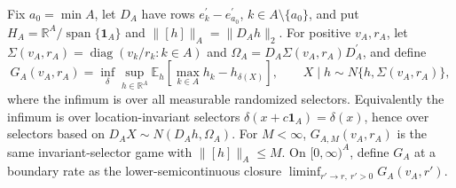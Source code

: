 Fix \(a_0=\min A\), let \(D_A\) have rows \(e_k^{\prime}-e_{a_0}^{\prime}\), \(k\in A\setminus\{a_0\}\), and put \(H_A=\mathbb R^A/\operatorname{span}\{\mathbf 1_A\}\) and \(\lVert[h]\rVert_A=\lVert D_Ah\rVert_2\).  For positive \(v_A,r_A\), let \(\Sigma(v_A,r_A)=\operatorname{diag}(v_k/r_k:k\in A)\) and \(\Omega_A=D_A\Sigma(v_A,r_A)D_A^{\prime}\), and define
\[
G_A(v_A,r_A)=\inf_{\delta}\sup_{h\in\mathbb R^A}\mathbb E_h\!\left[\max_{k\in A}h_k-h_{\delta(X)}\right],\qquad X\mid h\sim N\{h,\Sigma(v_A,r_A)\},
\]
where the infimum is over all measurable randomized selectors.  Equivalently the infimum is over location-invariant selectors \(\delta(x+c\mathbf 1_A)=\delta(x)\), hence over selectors based on \(D_AX\sim N(D_Ah,\Omega_A)\).  For \(M<\infty\), \(G_{A,M}(v_A,r_A)\) is the same invariant-selector game with \(\lVert[h]\rVert_A\leq M\).  On \([0,\infty)^A\), define \(G_A\) at a boundary rate as the lower-semicontinuous closure \(\liminf_{r'\to r,\ r'>0}G_A(v_A,r')\).